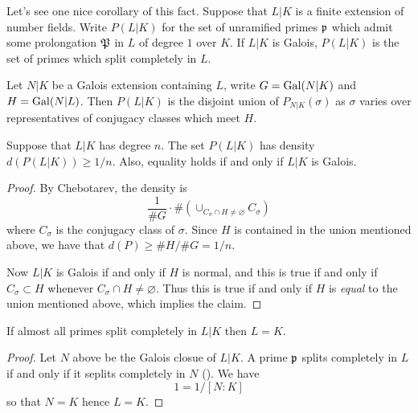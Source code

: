 Let's see one nice corollary of this fact.
Suppose that $L|K$ is a finite extension of number fields.
Write $P(L|K)$ for the set of unramified primes $\mathfrak{p}$ which admit some prolongation $\mathfrak{P}$ in $L$ of degree $1$ over $K$.
If $L|K$ is Galois, $P(L|K)$ is the set of primes which split completely in $L$.

\begin{lemma}
  Let $N|K$ be a Galois extension containing $L$, write $G = \operatorname{Gal}(N|K)$ and $H = \operatorname{Gal}(N|L)$.
  Then $P(L|K)$ is the disjoint union of $P_{N|K}(\sigma)$ as $\sigma$ varies over representatives of conjugacy classes which meet $H$.
\end{lemma}

\begin{corollary}
  Suppose that $L|K$ has degree $n$.
  The set $P(L|K)$ has density $d(P(L|K)) \geq 1/n$.
  Also, equality holds if and only if $L|K$ is Galois.
\end{corollary}
\begin{proof}
  By Chebotarev, the density is
  \[ \frac{1}{\#G} \cdot \#(\cup_{C_{\sigma} \cap H \neq \varnothing} C_{\sigma})\]
  where $C_{\sigma}$ is the conjugacy class of $\sigma$.
  Since $H$ is contained in the union mentioned above, we have that $d(P) \geq \#H/\#G = 1/n$.

  Now $L|K$ is Galois if and only if $H$ is normal, and this is true if and only if $C_{\sigma} \subset H$ whenever $C_{\sigma} \cap H \neq \varnothing$.
  Thus this is true if and only if $H$ is \emph{equal} to the union mentioned above, which implies the claim.
\end{proof}

\begin{corollary}
  If almost all primes split completely in $L|K$ then $L = K$.
\end{corollary}
\begin{proof}
  Let $N$ above be the Galois closue of $L|K$.
  A prime $\mathfrak{p}$ splits completely in $L$ if and only if it seplits completely in $N$ ().
  We have
  \[ 1 = 1/[N:K] \]
  so that $N = K$ hence $L = K$.
\end{proof}

